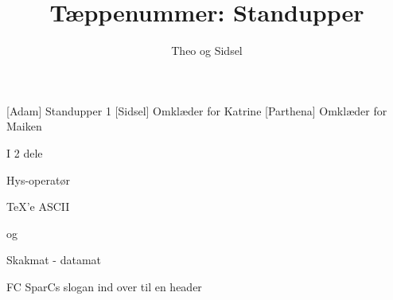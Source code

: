 \documentclass[danish]{article}
\title{Tæppenummer: Standupper}
\author{Theo og Sidsel}
\begin{document}
\maketitle

\begin{roles}
  [Adam] Standupper 1
  [Sidsel] Omklæder for Katrine
  [Parthena] Omklæder for Maiken
\end{roles}

\begin{sketch}

I 2 dele

Hys-operatør

TeX'e ASCII

og

Skakmat - datamat

FC SparCs slogan ind over til en header

\end{sketch}
\end{document}
